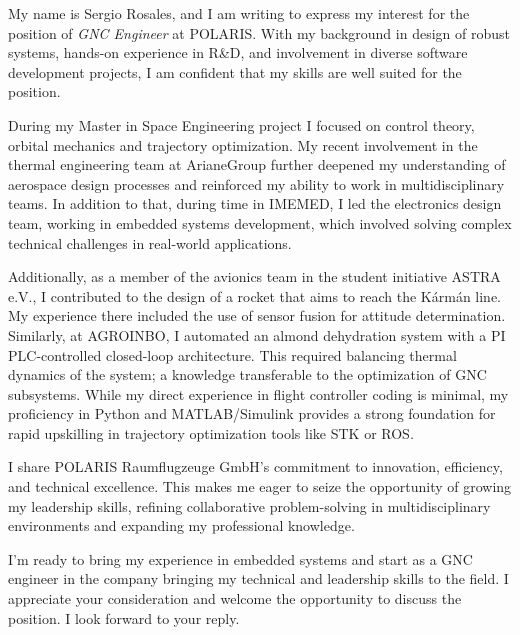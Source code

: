 


\begin{cvletter}
My name is Sergio Rosales, and I am writing to express my interest for
the position of \textit{GNC Engineer} at POLARIS. With my background
in design of robust systems, hands-on experience in R\&D, and
involvement in diverse software development projects, I am confident
that my skills are well suited for the position.

During my Master in Space Engineering project I focused on control
theory, orbital mechanics and trajectory optimization. My recent
involvement in the thermal engineering team at ArianeGroup further
deepened my understanding of aerospace design processes and reinforced
my ability to work in multidisciplinary teams. In addition to that,
during time in IMEMED, I led the electronics design team, working in
embedded systems development, which involved solving complex technical
challenges in real-world applications.

Additionally, as a member of the avionics team in the student
initiative ASTRA e.V., I contributed to the design of a rocket that
aims to reach the Kármán line. My experience there included the use of
sensor fusion for attitude determination. Similarly, at AGROINBO, I
automated an almond dehydration system with a PI PLC-controlled
closed-loop architecture. This required balancing thermal dynamics of
the system; a knowledge transferable to the optimization of GNC
subsystems. While my direct experience in flight controller coding is
minimal, my proficiency in Python and MATLAB/Simulink provides a
strong foundation for rapid upskilling in trajectory optimization
tools like STK or ROS.

I share POLARIS Raumflugzeuge GmbH's commitment to innovation,
efficiency, and technical excellence. This makes me eager to seize the
opportunity of growing my leadership skills, refining collaborative
problem-solving in multidisciplinary environments and expanding my
professional knowledge.

I'm ready to bring my experience in embedded systems and start as a
GNC engineer in the company bringing my technical and leadership
skills to the field. I appreciate your consideration and welcome the
opportunity to discuss the position.\hfill\break
I look forward to your reply.
\end{cvletter}